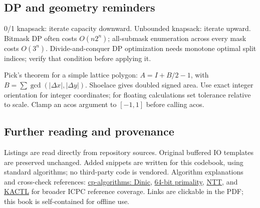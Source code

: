 \subsection{DP and geometry reminders}
0/1 knapsack: iterate capacity downward. Unbounded knapsack: iterate upward.
Bitmask DP often costs $O(n2^n)$; all-submask enumeration across every mask
costs $O(3^n)$. Divide-and-conquer DP optimization needs monotone optimal
split indices; verify that condition before applying it.

Pick's theorem for a simple lattice polygon:
$A=I+B/2-1$, with
$B=\sum\gcd(|\Delta x|,|\Delta y|)$.
Shoelace gives doubled signed area. Use exact integer orientation for integer
coordinates; for floating calculations set tolerance relative to scale.
Clamp an acos argument to $[-1,1]$ before calling acos.

\subsection{Further reading and provenance}
Listings are read directly from repository sources. Original buffered IO
templates are preserved unchanged. Added snippets are written
for this codebook, using standard algorithms; no third-party code is vendored.
Algorithm explanations and cross-check references:
\href{https://cp-algorithms.com/graph/dinic.html}{cp-algorithms: Dinic},
\href{https://cp-algorithms.com/algebra/primality_tests.html}{64-bit primality},
\href{https://cp-algorithms.com/algebra/fft.html}{NTT}, and
\href{https://github.com/kth-competitive-programming/kactl}{KACTL} for broader
ICPC reference coverage. Links are clickable in the PDF; this book is
self-contained for offline use.

